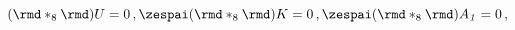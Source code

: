 \begin{equation}
(\rmd *_8\rmd)U=0 \,, \zespai (\rmd *_8\rmd)K=0 \,, \zespai (\rmd
*_8\rmd)A_{\it 1}=0 \,, \label{harmonic}
\end{equation}

